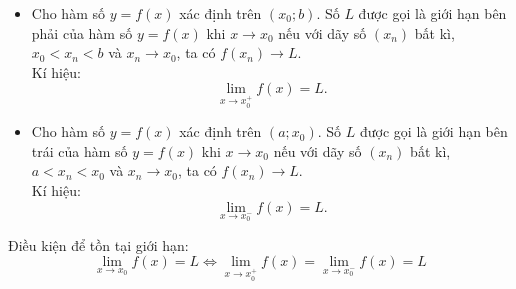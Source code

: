 \begin{itemize}
\begin{itemize}
	\item Cho hàm số $y=f(x)$ xác định trên $\left({x_0;b}\right) $. Số $L$ được gọi là giới hạn bên phải của hàm số $y=f(x)$ khi $x\to x_0$ nếu với dãy số $\left({x_n}\right)$ bất kì, $x_0<x_n<b$ và $x_n\to x_0$, ta có $f\left({x_n}\right)\to L $.\\
	Kí hiệu: $$\lim\limits_{x\to x_0^+}f(x)=L. $$
	\item Cho hàm số $y=f(x)$ xác định trên $\left({a;x_0}\right) $.
	Số $L$ được gọi là giới hạn bên trái của hàm số $y=f(x)$ khi $x\to x_0$ nếu với dãy số $\left({x_n}\right)$ bất kì, $a<x_n<x_0$ và $x_n\to x_0$, ta có $f\left({x_n}\right)\to L $. \\
	Kí hiệu: $$\lim\limits_{x\to x_0^-}f(x)=L. $$
\end{itemize}
\begin{luuy}
	Điều kiện để tồn tại giới hạn:
	\[\lim\limits_{x\to x_0}f\left(x\right)=L\Leftrightarrow \lim\limits_{x\to x_0^+}f\left(x\right)=\lim\limits_{x\to x_0^-}f\left(x\right)=L\]
\end{luuy}
\end{itemize}
